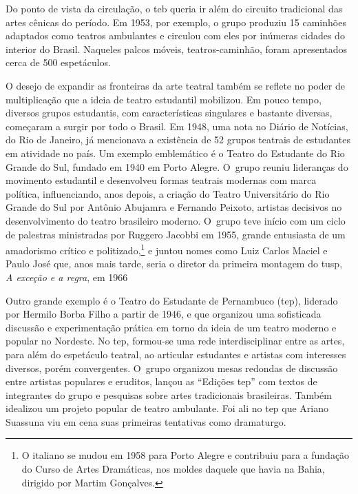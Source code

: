 {Do ponto de vista da circulação, o {\sc teb} queria ir além do circuito
tradicional das artes cênicas do período. Em 1953, por exemplo, o grupo
produziu 15 caminhões adaptados como teatros ambulantes e circulou com
eles por inúmeras cidades do interior do Brasil. Naqueles palcos móveis,
teatros-caminhão, foram apresentados cerca de 500 espetáculos.

\subject{Constituição de uma cena estudantil no teatro brasileiro dos anos
1940 e 1950}

O desejo de expandir as fronteiras da arte teatral também se reflete no
poder de multiplicação que a ideia de teatro estudantil mobilizou. Em
pouco tempo, diversos grupos estudantis, com características singulares
e bastante diversas, começaram a surgir por todo o Brasil. Em 1948, uma
nota no Diário de Notícias, do Rio de Janeiro, já mencionava a
existência de 52 grupos teatrais de estudantes em atividade no país. Um
exemplo emblemático é o Teatro do Estudante do Rio Grande do Sul,
fundado em 1940 em Porto Alegre. O~grupo reuniu lideranças do movimento
estudantil e desenvolveu formas teatrais modernas com marca política,
influenciando, anos depois, a criação do Teatro Universitário do Rio
Grande do Sul por Antônio Abujamra e Fernando Peixoto, artistas
decisivos no desenvolvimento do teatro brasileiro moderno. O~grupo teve
início com um ciclo de palestras ministradas por Ruggero Jacobbi em
1955, grande entusiasta de um amadorismo crítico e
politizado,\footnote{O italiano se mudou em 1958 para Porto Alegre e
  contribuiu para a fundação do Curso de Artes Dramáticas, nos moldes
  daquele que havia na Bahia, dirigido por Martim Gonçalves.} e juntou
nomes como Luiz Carlos Maciel e Paulo José que, anos mais tarde, seria o
diretor da primeira montagem do {\sc tusp}, {\it A exceção e a regra}, em 1966

Outro grande exemplo é o Teatro do Estudante de Pernambuco ({\sc tep}),
liderado por Hermilo Borba Filho a partir de 1946, e que organizou uma
sofisticada discussão e experimentação prática em torno da ideia de um
teatro moderno e popular no Nordeste. No {\sc tep}, formou-se uma rede
interdisciplinar entre as artes, para além do espetáculo teatral, ao
articular estudantes e artistas com interesses diversos, porém
convergentes. O~grupo organizou mesas redondas de discussão entre
artistas populares e eruditos, lançou as “Edições {\sc tep}” com textos de
integrantes do grupo e pesquisas sobre artes tradicionais brasileiras.
Também idealizou um projeto popular de teatro ambulante. Foi ali no {\sc tep}
que Ariano Suassuna viu em cena suas primeiras tentativas como
dramaturgo.

}
